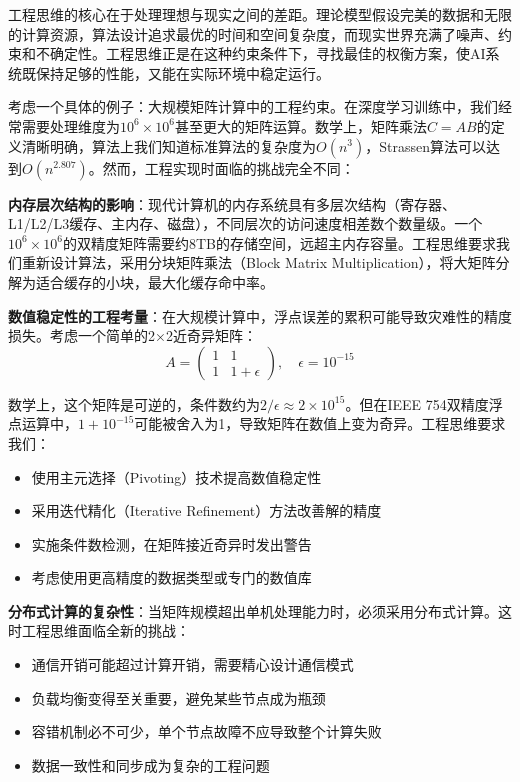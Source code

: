 工程思维的核心在于处理理想与现实之间的差距。理论模型假设完美的数据和无限的计算资源，算法设计追求最优的时间和空间复杂度，而现实世界充满了噪声、约束和不确定性。工程思维正是在这种约束条件下，寻找最佳的权衡方案，使AI系统既保持足够的性能，又能在实际环境中稳定运行。

考虑一个具体的例子：大规模矩阵计算中的工程约束。在深度学习训练中，我们经常需要处理维度为$10^6 \times 10^6$甚至更大的矩阵运算。数学上，矩阵乘法$C = AB$的定义清晰明确，算法上我们知道标准算法的复杂度为$O(n^3)$，Strassen算法可以达到$O(n^{2.807})$。然而，工程实现时面临的挑战完全不同：

\textbf{内存层次结构的影响}：现代计算机的内存系统具有多层次结构（寄存器、L1/L2/L3缓存、主内存、磁盘），不同层次的访问速度相差数个数量级。一个$10^6 \times 10^6$的双精度矩阵需要约8TB的存储空间，远超主内存容量。工程思维要求我们重新设计算法，采用分块矩阵乘法（Block Matrix Multiplication），将大矩阵分解为适合缓存的小块，最大化缓存命中率。

\textbf{数值稳定性的工程考量}：在大规模计算中，浮点误差的累积可能导致灾难性的精度损失。考虑一个简单的2×2近奇异矩阵：
$$A = \begin{pmatrix} 1 & 1 \\ 1 & 1+\epsilon \end{pmatrix}, \quad \epsilon = 10^{-15}$$

数学上，这个矩阵是可逆的，条件数约为$2/\epsilon \approx 2 \times 10^{15}$。但在IEEE 754双精度浮点运算中，$1 + 10^{-15}$可能被舍入为1，导致矩阵在数值上变为奇异。工程思维要求我们：
\begin{itemize}
\item 使用主元选择（Pivoting）技术提高数值稳定性
\item 采用迭代精化（Iterative Refinement）方法改善解的精度
\item 实施条件数检测，在矩阵接近奇异时发出警告
\item 考虑使用更高精度的数据类型或专门的数值库
\end{itemize}

\textbf{分布式计算的复杂性}：当矩阵规模超出单机处理能力时，必须采用分布式计算。这时工程思维面临全新的挑战：
\begin{itemize}
\item 通信开销可能超过计算开销，需要精心设计通信模式
\item 负载均衡变得至关重要，避免某些节点成为瓶颈
\item 容错机制必不可少，单个节点故障不应导致整个计算失败
\item 数据一致性和同步成为复杂的工程问题
\end{itemize}

